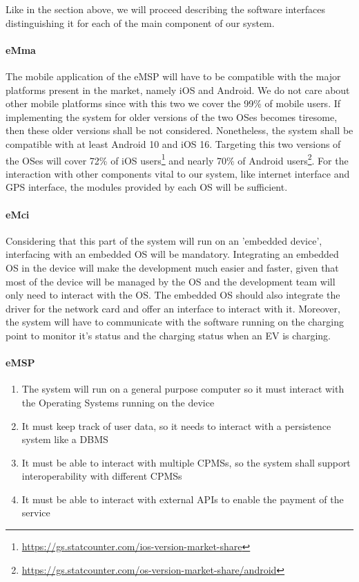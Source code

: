 Like in the section above, we will proceed describing the software interfaces distinguishing it for each of the main component of our system.

\paragraph{eMma} The mobile application of the eMSP will have to be compatible with the major platforms present in the market, namely iOS and Android. We do not care about other mobile platforms since with this two we cover the 99\% of mobile users. If implementing the system for older versions of the two OSes becomes tiresome, then these older versions shall be not considered. Nonetheless, the system shall be compatible with at least Android 10 and iOS 16. Targeting this two versions of the OSes will cover 72\% of iOS users\footnote{\url{https://gs.statcounter.com/ios-version-market-share}} and nearly 70\% of Android users\footnote{\url{https://gs.statcounter.com/os-version-market-share/android}}. For the interaction with other components vital to our system, like internet interface and GPS interface, the modules provided by each OS will be sufficient.

\paragraph{eMci} Considering that this part of the system will run on an 'embedded device', interfacing with an embedded OS will be mandatory. Integrating an embedded OS in the device will make the development much easier and faster, given that most of the device will be managed by the OS and the development team will only need to interact with the OS. The embedded OS should also integrate the driver for the network card and offer an interface to interact with it. Moreover, the system will have to communicate with the software running on the charging point to monitor it's status and the charging status when an EV is charging.

\paragraph{eMSP} 
\begin{enumerate}
    \item The system will run on a general purpose computer so it must interact with the Operating Systems running on the device
    \item It must keep track of user data, so it needs to interact with a persistence system like a DBMS
    \item It must be able to interact with multiple CPMSs, so the system shall support interoperability with different CPMSs
    \item It must be able to interact with external APIs to enable the payment of the service
\end{enumerate}

